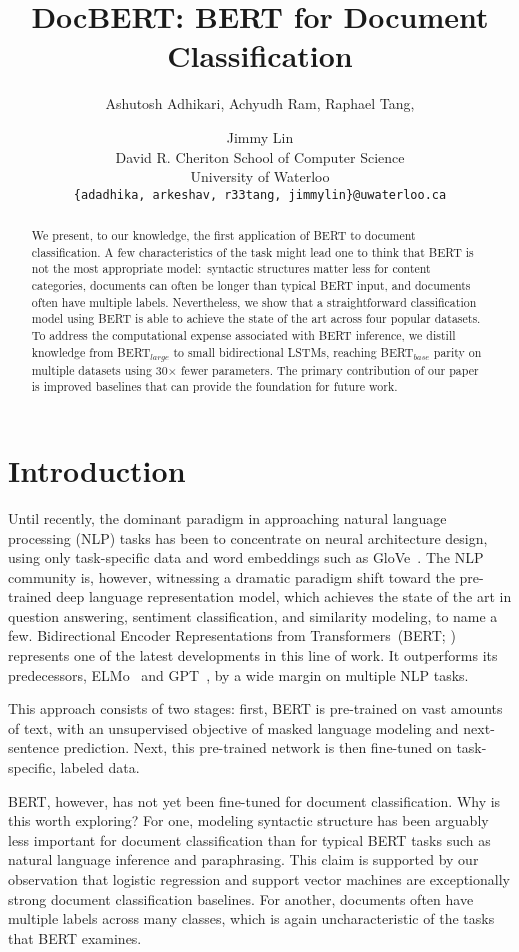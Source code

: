 \documentclass[11pt,a4paper]{article}
\title{DocBERT: BERT for Document Classification}
\author{Ashutosh Adhikari, Achyudh Ram, Raphael Tang, \and Jimmy Lin\vspace{0.1cm}\\
David R. Cheriton School of Computer Science\\
University of Waterloo\\
{\tt \{adadhika, arkeshav, r33tang, jimmylin\}@uwaterloo.ca}}
\date{}
\newcommand{\BERTL}[1]{BERT$_{large}$}
\newcommand{\BERTB}[1]{BERT$_{base}$}
\begin{document}
\maketitle
\begin{abstract}
We present, to our knowledge, the first application of BERT to document classification.
A few characteristics of the task might lead one to think that BERT is not the most appropriate model:\ syntactic structures matter less for content categories, documents can often be longer than typical BERT input, and documents often have multiple labels.
Nevertheless, we show that a straightforward classification model using BERT is able to achieve the state of the art across four popular datasets.
To address the computational expense associated with BERT inference, we distill knowledge from \BERTL{} to small bidirectional LSTMs, reaching \BERTB{} parity on multiple datasets using 30$\times$ fewer parameters.
The primary contribution of our paper is improved baselines that can provide the foundation for future work.
\end{abstract}

\section{Introduction}
Until recently, the dominant paradigm in approaching natural language processing (NLP) tasks has been to concentrate on neural architecture design, using only task-specific data and word embeddings such as GloVe~\cite{pennington2014glove}.
The NLP community is, however, witnessing a dramatic paradigm shift toward the pre-trained deep language representation model, which achieves the state of the art in question answering, sentiment classification, and similarity modeling, to name a few.
Bidirectional Encoder Representations from Transformers~(BERT; \citealp{devlin2018bert}) represents one of the latest developments in this line of work.
It outperforms its predecessors, ELMo~\cite{elmo} and GPT~\cite{radfordimproving}, by a wide margin on multiple NLP tasks.

This approach consists of two stages: first, BERT is pre-trained on vast amounts of text, with an unsupervised objective of masked language modeling and next-sentence prediction.
Next, this pre-trained network is then fine-tuned on task-specific, labeled data.

BERT, however, has not yet been fine-tuned for document classification.
Why is this worth exploring?
For one, modeling syntactic structure has been arguably less important for document classification than for typical BERT tasks such as natural language inference and paraphrasing.
This claim is supported by our observation that logistic regression and support vector machines are exceptionally strong document classification baselines.
For another, documents often have multiple labels across many classes, which is again uncharacteristic of the tasks that BERT examines.
\end{document}
